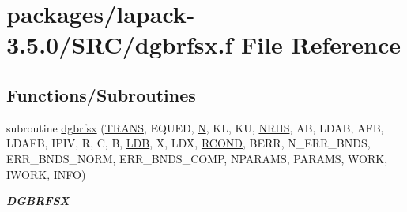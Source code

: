 \hypertarget{dgbrfsx_8f}{}\section{packages/lapack-\/3.5.0/\+S\+R\+C/dgbrfsx.f File Reference}
\label{dgbrfsx_8f}
\subsection*{Functions/\+Subroutines}
\begin{DoxyCompactItemize}
\item 
subroutine \hyperlink{group__doubleGBcomputational_gab44677451338eb1a966f510ca0a38d1c}{dgbrfsx} (\hyperlink{superlu__enum__consts_8h_a0c4e17b2d5cea33f9991ccc6a6678d62a1f61e3015bfe0f0c2c3fda4c5a0cdf58}{T\+R\+A\+N\+S}, E\+Q\+U\+E\+D, \hyperlink{polmisc_8c_a0240ac851181b84ac374872dc5434ee4}{N}, K\+L, K\+U, \hyperlink{example__user_8c_aa0138da002ce2a90360df2f521eb3198}{N\+R\+H\+S}, A\+B, L\+D\+A\+B, A\+F\+B, L\+D\+A\+F\+B, I\+P\+I\+V, R, C, B, \hyperlink{example__user_8c_a50e90a7104df172b5a89a06c47fcca04}{L\+D\+B}, X, L\+D\+X, \hyperlink{superlu__enum__consts_8h_af00a42ecad444bbda75cde1b64bd7e72a9b5c151728d8512307565994c89919d5}{R\+C\+O\+N\+D}, B\+E\+R\+R, N\+\_\+\+E\+R\+R\+\_\+\+B\+N\+D\+S, E\+R\+R\+\_\+\+B\+N\+D\+S\+\_\+\+N\+O\+R\+M, E\+R\+R\+\_\+\+B\+N\+D\+S\+\_\+\+C\+O\+M\+P, N\+P\+A\+R\+A\+M\+S, P\+A\+R\+A\+M\+S, W\+O\+R\+K, I\+W\+O\+R\+K, I\+N\+F\+O)
\begin{DoxyCompactList}\small\item\em {\bfseries D\+G\+B\+R\+F\+S\+X} \end{DoxyCompactList}\end{DoxyCompactItemize}
